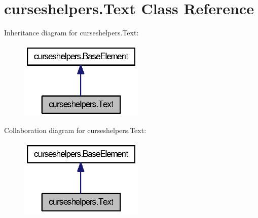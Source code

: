 \section{curseshelpers.\-Text Class Reference}
\label{classcurseshelpers_1_1Text}


Inheritance diagram for curseshelpers.\-Text\-:
\nopagebreak
\begin{figure}[H]
\begin{center}
\leavevmode
\includegraphics[width=168pt]{classcurseshelpers_1_1Text__inherit__graph}
\end{center}
\end{figure}


Collaboration diagram for curseshelpers.\-Text\-:
\nopagebreak
\begin{figure}[H]
\begin{center}
\leavevmode
\includegraphics[width=168pt]{classcurseshelpers_1_1Text__coll__graph}
\end{center}
\end{figure}
